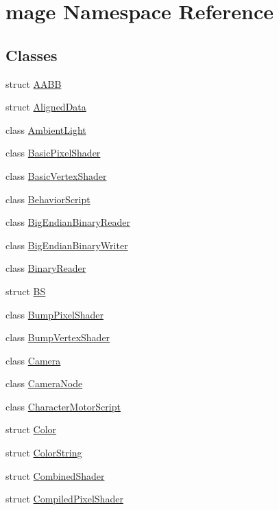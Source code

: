 \hypertarget{namespacemage}{}\section{mage Namespace Reference}
\label{namespacemage}
\subsection*{Classes}
\begin{DoxyCompactItemize}
\item 
struct \hyperlink{structmage_1_1_a_a_b_b}{A\+A\+BB}
\item 
struct \hyperlink{structmage_1_1_aligned_data}{Aligned\+Data}
\item 
class \hyperlink{classmage_1_1_ambient_light}{Ambient\+Light}
\item 
class \hyperlink{classmage_1_1_basic_pixel_shader}{Basic\+Pixel\+Shader}
\item 
class \hyperlink{classmage_1_1_basic_vertex_shader}{Basic\+Vertex\+Shader}
\item 
class \hyperlink{classmage_1_1_behavior_script}{Behavior\+Script}
\item 
class \hyperlink{classmage_1_1_big_endian_binary_reader}{Big\+Endian\+Binary\+Reader}
\item 
class \hyperlink{classmage_1_1_big_endian_binary_writer}{Big\+Endian\+Binary\+Writer}
\item 
class \hyperlink{classmage_1_1_binary_reader}{Binary\+Reader}
\item 
struct \hyperlink{structmage_1_1_b_s}{BS}
\item 
class \hyperlink{classmage_1_1_bump_pixel_shader}{Bump\+Pixel\+Shader}
\item 
class \hyperlink{classmage_1_1_bump_vertex_shader}{Bump\+Vertex\+Shader}
\item 
class \hyperlink{classmage_1_1_camera}{Camera}
\item 
class \hyperlink{classmage_1_1_camera_node}{Camera\+Node}
\item 
class \hyperlink{classmage_1_1_character_motor_script}{Character\+Motor\+Script}
\item 
struct \hyperlink{structmage_1_1_color}{Color}
\item 
struct \hyperlink{structmage_1_1_color_string}{Color\+String}
\item 
struct \hyperlink{structmage_1_1_combined_shader}{Combined\+Shader}
\item 
struct \hyperlink{structmage_1_1_compiled_pixel_shader}{Compiled\+Pixel\+Shader}

\end{DoxyCompactItemize}
